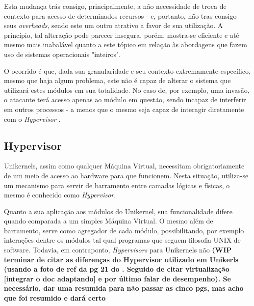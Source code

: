 \documentclass[12pt]{article}
\begin{document}
 Esta mudança trás consigo, principalmente, a não necessidade de troca de contexto para acesso de determinados recursos - e, portanto, não tras consigo seus \textit{overheads}, sendo este um outro atrativo a favor de sua utilização. A princípio, tal alteração pode parecer insegura, porém, mostra-se eficiente e até mesmo mais inabalável quanto a este tópico em relação às abordagens que fazem uso de sistemas operacionais "inteiros".
 
 O ocorrido é que, dada sua granularidade e seu contexto extremamente específico, mesmo que haja algum problema, este não é capaz de alterar o sistema que utilizará estes módulos em sua totalidade. No caso de, por exemplo, uma invasão, o atacante terá acesso apenas ao módulo em questão, sendo incapaz de interferir em outros processos - a menos que o mesmo seja capaz de interagir diretamente com o \textit{Hypervisor} \cite{fraga:120}. 
 
 \subsection{Hypervisor}
 
 Unikernels, assim como qualquer Máquina Virtual, necessitam obrigatoriamente de um meio de acesso ao hardware para que funcionem. Nesta situação, utiliza-se um mecanismo para servir de barramento entre camadas lógicas e físicas, o mesmo é conhecido como \textit{Hypervisor}.
 
 Quanto a sua aplicação aos módulos do Unikernel, sua funcionalidade difere quando comparada a um simples Máquina Virtual. O mesmo além de barramento, serve como agregador de cada módulo, possibilitando, por exemplo interações dentre os módulos tal qual programas que seguem filosofia UNIX de software. Todavia, em contraponto, \textit{Hypervisors} para Unikernels não \textbf{(WIP terminar de citar as diferenças do Hypervisor utilizado em Unikerls (usando a foto de ref da pg 21 do \cite{fraga:120}. Seguido de citar virtualização [integrar o doc adaptando] e por último falar de desempenho). Se necessário, dar uma resumida para não passar as cinco pgs, mas acho que foi resumido e dará certo} %



\end{document}
